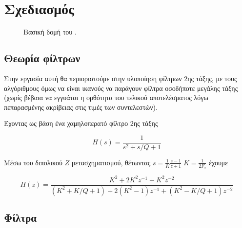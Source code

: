 \documentclass[12pt]{extarticle}
\begin{document}
\section{Σχεδιασμός}

\begin{figure}[!htb]

    \begin{center}
    \end{center}

    \caption{Βασική δομή του .} 
\end{figure}

\subsection{Θεωρία  φίλτρων}

Στην εργασία αυτή θα περιοριστούμε στην υλοποίηση φίλτρων 2ης τάξης, με τους 
αλγόριθμους όμως να είναι ικανούς να παράγουν φίλτρα οσοδήποτε μεγάλης τάξης (χωρίς 
βέβαια να εγγυάται η ορθότητα του τελικού αποτελέσματος λόγω πεπαρασμένης ακρίβειας 
στις τιμές των συντελεστών). 

Έχοντας ως βάση ένα χαμηλοπερατό φίλτρο 2ης τάξης \cite{OpenheimAlan}

\begin{equation}
    H(s) = \frac{1}{s^2 + s/Q + 1} 
    \label{eq:h_lowpassfilter}
\end{equation}

Μέσω του διπολικού $Z$ μετασχηματισμού, θέτωντας $s = \frac{1}{K}\frac{z-1}{z+1} \; K = \frac{1}{2F_s}$ έχουμε \cite{BilinearZTransformWeb}

\begin{equation}
    H(z) = \frac{K^2 + 2K^2 z^{-1} + K^2 z^{-2}}{(K^2 + K/Q + 1) + 2(K^2 - 1) z^{-1} + (K^2 - K/Q + 1) z^{-2}}
    \label{eq:h_z_final}
\end{equation}


\subsection{Φίλτρα } 
\end{document}
